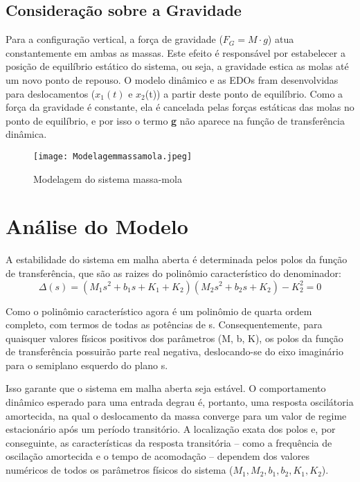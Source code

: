 \documentclass[9pt,a4paper,twocolumn,twoside]{tau-class/tau}
\begin{document}
\subsection{Consideração sobre a Gravidade}

Para a configuração vertical, a força de gravidade ($F_G = M \cdot g$) atua constantemente em ambas as massas. Este efeito é responsável por estabelecer a posição de equilíbrio estático do sistema, ou seja, a gravidade estica as molas até um novo ponto de repouso. O modelo dinâmico e as EDOs fram desenvolvidas para deslocamentos ($x_1(t)$ e $x_2$(t)) a partir deste ponto de equilíbrio. Como a força da gravidade é constante, ela é cancelada pelas forças estáticas das molas no ponto de equilíbrio, e por isso o termo \textbf{g} não aparece na função de transferência dinâmica.


\begin{figure}[H]
    \centering
    \texttt{[image: Modelagemmassamola.jpeg]}
    \caption{Modelagem do sistema massa-mola}
    \label{fig:MSM}
\end{figure}


\section{Análise do Modelo}

A estabilidade do sistema em malha aberta é determinada pelos polos da função de transferência, que são as raizes do polinômio característico do denominador:
\begin{equation}
    \Delta (s) = (M_1s^2 + b_1s + K_1 + K_2)(M_2s^2 + b_2s + K_2) - K_2^2 = 0
\label{eq:raizes}
\end{equation}

Como o polinômio característico agora é um polinômio de quarta ordem completo, com termos de todas as potências de s. Consequentemente, para quaisquer valores físicos positivos dos parâmetros (M, b, K), os polos da função de transferência possuirão parte real negativa, deslocando-se do eixo imaginário para o semiplano esquerdo do plano s.

Isso garante que o sistema em malha aberta seja estável. O comportamento dinâmico esperado para uma entrada degrau é, portanto, uma resposta oscilátoria amortecida, na qual o deslocamento da massa converge para um valor de regime estacionário após um período transitório. A localização exata dos polos e, por conseguinte, as características da resposta transitória -- como a frequência de oscilação amortecida e o tempo de acomodação -- dependem dos valores numéricos de todos os parâmetros físicos do sistema ($M_1, M_2, b_1, b_2, K_1, K_2$).
\end{document}
